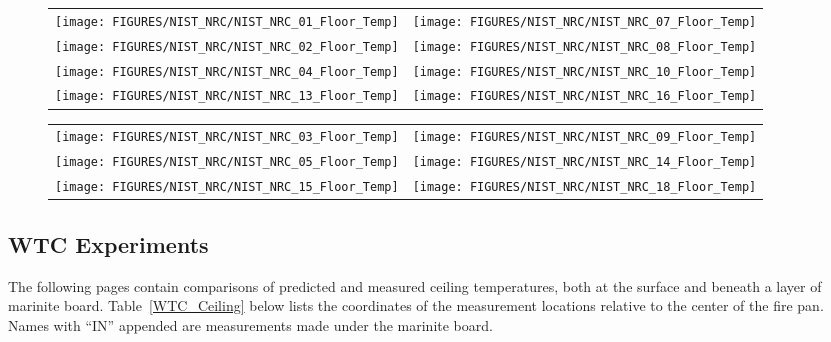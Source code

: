 \begin{figure}[p]
\begin{tabular*}{\textwidth}{l@{\extracolsep{\fill}}r}
\texttt{[image: FIGURES/NIST\_NRC/NIST\_NRC\_01\_Floor\_Temp]} &
\texttt{[image: FIGURES/NIST\_NRC/NIST\_NRC\_07\_Floor\_Temp]} \\
\texttt{[image: FIGURES/NIST\_NRC/NIST\_NRC\_02\_Floor\_Temp]} &
\texttt{[image: FIGURES/NIST\_NRC/NIST\_NRC\_08\_Floor\_Temp]} \\
\texttt{[image: FIGURES/NIST\_NRC/NIST\_NRC\_04\_Floor\_Temp]} &
\texttt{[image: FIGURES/NIST\_NRC/NIST\_NRC\_10\_Floor\_Temp]} \\
\texttt{[image: FIGURES/NIST\_NRC/NIST\_NRC\_13\_Floor\_Temp]} &
\texttt{[image: FIGURES/NIST\_NRC/NIST\_NRC\_16\_Floor\_Temp]}
\end{tabular*}
\label{NIST_NRC_Floor_Temp_Closed}
\end{figure}

\begin{figure}[p]
\begin{tabular*}{\textwidth}{l@{\extracolsep{\fill}}r}
\texttt{[image: FIGURES/NIST\_NRC/NIST\_NRC\_03\_Floor\_Temp]} &
\texttt{[image: FIGURES/NIST\_NRC/NIST\_NRC\_09\_Floor\_Temp]} \\
\texttt{[image: FIGURES/NIST\_NRC/NIST\_NRC\_05\_Floor\_Temp]} &
\texttt{[image: FIGURES/NIST\_NRC/NIST\_NRC\_14\_Floor\_Temp]} \\
\texttt{[image: FIGURES/NIST\_NRC/NIST\_NRC\_15\_Floor\_Temp]} &
\texttt{[image: FIGURES/NIST\_NRC/NIST\_NRC\_18\_Floor\_Temp]}
\end{tabular*}
\label{NIST_NRC_Floor_Temp_Open}
\end{figure}

\clearpage


\subsection{WTC Experiments}

The following pages contain comparisons of predicted and measured ceiling temperatures, both at the surface and beneath a layer of marinite board. Table~\ref{WTC_Ceiling} below lists the coordinates of the measurement locations relative to the center of the fire pan. Names with ``IN'' appended are measurements made under the marinite board.


